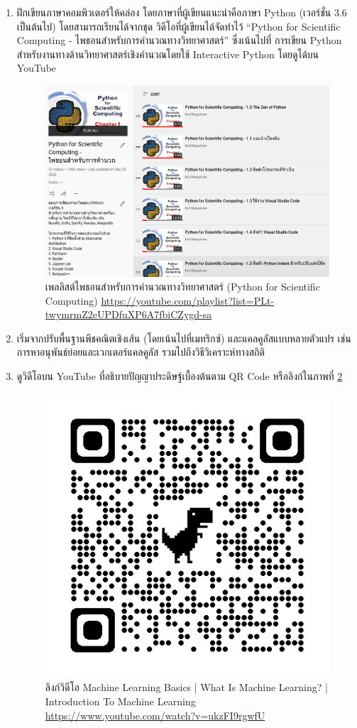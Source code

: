 \begin{enumerate}
    \item ฝึกเขียนภาษาคอมพิวเตอร์ให้คล่อง โดยภาษาที่ผู้เขียนแนะนำคือภาษา Python (เวอร์ชั่น 3.6 เป็นต้นไป) โดยสามารถเรียนได้จากชุด%
    วิดีโอที่ผู้เขียนได้จัดทำไว้ \enquote{Python for Scientific Computing - ไพธอนสำหรับการคำนวณทางวิทยาศาสตร์} ซึ่งเน้นไปที่%
    การเขียน Python สำหรับงานทางด้านวิทยาศาสตร์เชิงคำนวณโดยใช้ Interactive Python โดยดูได้บน YouTube
    
    \begin{figure}[H]
        \centering
        \includegraphics[width=0.9\linewidth]{fig/youtube_python_sci.png}
        \caption{เพลลิสต์ไพธอนสำหรับการคำนวณทางวิทยาศาสตร์ (Python for Scientific Computing) 
        \url{https://youtube.com/playlist?list=PLt-twymrmZ2eUPDfuXP6A7fbiCZygd-sa}}
        \label{fig:yt_python_sci}
    \end{figure}

    \item เริ่มจากปรับพื้นฐานพีชคณิตเชิงเส้น (โดยเน้นไปที่เมทริกซ์) และแคลคูลัสแบบหลายตัวแปร เช่น การหาอนุพันธ์ย่อยและเวกเตอร์แคลคูลัส 
    รวมไปถึงวิธีวิเคราะห์ทางสถิติ
    
    \item ดูวิดีโอบน YouTube ที่อธิบายปัญญาประดิษฐ์เบื้องต้นตาม QR Code หรือลิงก์ในภาพที่ \ref{fig:qr_code_intro_ml}
    
    \begin{figure}[H]
        \centering
        \includegraphics[width=0.3\linewidth]{fig/qr_code_intro_ml.png}
        \caption{ลิงก์วิดีโอ Machine Learning Basics | What Is Machine Learning? | Introduction To Machine 
        Learning \url{https://www.youtube.com/watch?v=ukzFI9rgwfU}}
        \label{fig:qr_code_intro_ml}
    \end{figure}


\end{enumerate}
